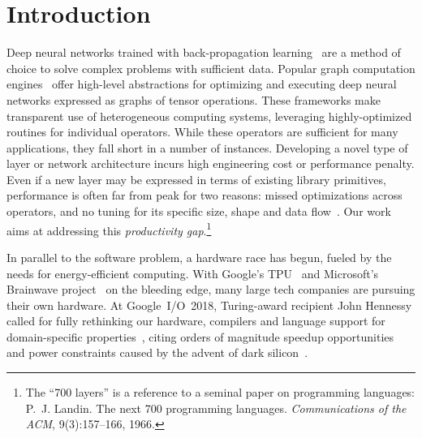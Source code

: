 \section{Introduction}

Deep neural networks trained with back-propagation
learning~\cite{Backprop89} are a method of choice to solve complex
problems with sufficient data. Popular graph computation
engines~\cite{Theano,Torch7,MXNet,TensorFlow,PyTorch} offer high-level
abstractions for optimizing and executing deep neural networks
expressed as graphs of tensor operations. These frameworks make
transparent use of heterogeneous computing systems, leveraging
highly-optimized routines for individual operators.  While these
operators are sufficient for many applications, they fall short in a
number of instances.  Developing a novel type of layer or network
architecture incurs high engineering cost or performance penalty.
Even if a new layer may be expressed in terms of existing library
primitives, performance is often far from peak for two reasons: missed
optimizations across operators, and no tuning for its specific
size, shape and data flow~\cite{FBFFT15}.  Our work aims at addressing this
\emph{productivity gap}.\footnote{The ``700 layers'' is a reference to
  a seminal paper on programming languages: P.~J. Landin. The next 700
  programming languages. \emph{Communications of the ACM},
  9(3):157--166, 1966.}

In parallel to the software problem, a hardware race has begun, fueled by the
needs for energy-efficient computing. With Google's TPU~\cite{TPU17}
and Microsoft's Brainwave project~\cite{Brainwave17} on the bleeding edge,
many large tech companies are pursuing their own hardware.
At Google~I/O~2018, Turing-award recipient John Hennessy called
for fully rethinking our hardware, compilers and language support for
domain-specific properties~\cite{HennessyIO18}, citing orders of magnitude
speedup opportunities and power constraints caused by the advent of dark
silicon~\cite{DarkSilicon}.

